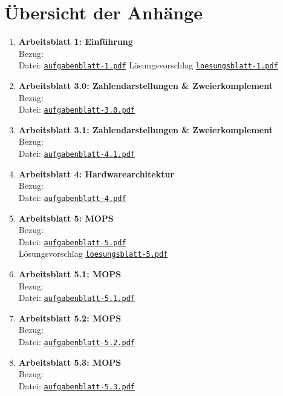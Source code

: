 \documentclass[../skript/main.tex]{subfiles}
\begin{document}
	\section*{Übersicht der Anhänge}
	\begin{enumerate}
		\item \textbf{Arbeitsblatt 1: Einführung}\\
		Bezug: \\
		\small Datei: \hyperlink{ab1}{\texttt{aufgabenblatt-1.pdf}}
		Lösungsvorschlag \hyperlink{lab1}{\texttt{loesungsblatt-1.pdf}}
		
		\item \textbf{Arbeitsblatt 3.0: Zahlendarstellungen \& Zweierkomplement}\\
		Bezug: \\
		\small Datei: \hyperlink{ab3.0}{\texttt{aufgabenblatt-3.0.pdf}}
		
		\item \textbf{Arbeitsblatt 3.1: Zahlendarstellungen \& Zweierkomplement}\\
		Bezug: \\
		\small Datei: \hyperlink{ab3.1}{\texttt{aufgabenblatt-4.1.pdf}}
		
		\item \textbf{Arbeitsblatt 4: Hardwarearchitektur}\\
		Bezug: \\
		\small Datei: \hyperlink{ab4}{\texttt{aufgabenblatt-4.pdf}}
		
		\item \textbf{Arbeitsblatt 5: MOPS}\\
		Bezug: \\
		\small Datei: \hyperlink{ab4}{\texttt{aufgabenblatt-5.pdf}}
		\\ Lösungsvorschlag \hyperlink{lab5}{\texttt{loesungsblatt-5.pdf}}
		
		\item \textbf{Arbeitsblatt 5.1: MOPS}\\
		Bezug: \\
		\small Datei: \hyperlink{ab5.1}{\texttt{aufgabenblatt-5.1.pdf}}
		
		\item \textbf{Arbeitsblatt 5.2: MOPS}\\
		Bezug: \\
		\small Datei: \hyperlink{ab5.2}{\texttt{aufgabenblatt-5.2.pdf}}
		
		\item \textbf{Arbeitsblatt 5.3: MOPS}\\
		Bezug: \\
		\small Datei: \hyperlink{ab5.3}{\texttt{aufgabenblatt-5.3.pdf}}
	\end{enumerate}
	
\end{document}
